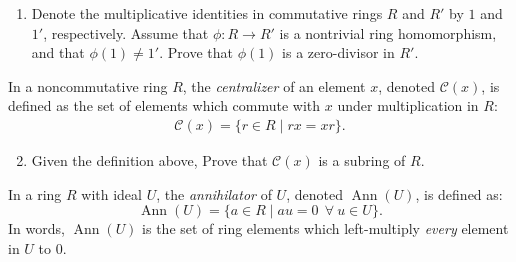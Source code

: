 \begin{enumerate}
    \setlength{\itemsep}{10pt} %
    \item Denote the multiplicative identities in commutative rings $R$ and $R'$ by $1$ and $1'$, respectively. Assume that $\phi: R \to R'$ is a nontrivial ring homomorphism, and that $\phi(1) \neq 1'$. Prove that $\phi(1)$ is a zero-divisor in $R'$. \\ \steezybreak

\end{enumerate}
\begin{definition}[Centralizer]
    In a noncommutative ring $R$, the \textit{centralizer} of an element $x$, denoted $\mathcal{C}(x)$, is defined as the set of elements which commute with $x$ under multiplication in $R$:
\begin{align*}
    \mathcal{C}(x) = \{ r \in R \mid rx = xr \}.
\end{align*}
\end{definition}
\begin{enumerate}
    \setcounter{enumi}{1}
    
    \item Given the definition above, Prove that $\mathcal{C}(x)$ is a subring of $R$. \\ \steezybreak
\end{enumerate}

\begin{definition}[Annihilator]
    In a ring $R$ with ideal $U$, the \textit{annihilator} of $U$, denoted $\operatorname{Ann}(U)$, is defined as:
\[
\operatorname{Ann}(U) = \{ a \in R \mid au = 0 \ \ \forall \ u \in U \}.
\]
In words, $\operatorname{Ann}(U)$ is the set of ring elements which left-multiply \textit{every} element in $U$ to $0$. 
\end{definition}

